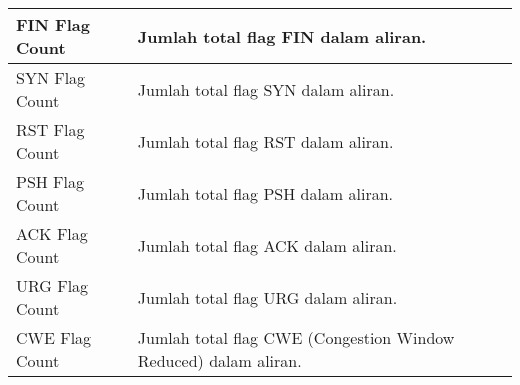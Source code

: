 \documentclass[a4paper,12pt]{report}
\begin{document}
\begin{table}[h!]
\begin{longtable}{|p{3cm} |p{10cm}|}
		\hline
		FIN Flag Count & Jumlah total flag FIN dalam aliran. \\
		\hline
		SYN Flag Count & Jumlah total flag SYN dalam aliran. \\
		\hline
		RST Flag Count & Jumlah total flag RST dalam aliran. \\
		\hline
		PSH Flag Count & Jumlah total flag PSH dalam aliran. \\
		\hline
		ACK Flag Count & Jumlah total flag ACK dalam aliran. \\
		\hline
		URG Flag Count & Jumlah total flag URG dalam aliran. \\
		\hline
		CWE Flag Count & Jumlah total flag CWE (Congestion Window Reduced) dalam aliran. \\
		\hline
	\end{longtable}
\end{table}
\newpage
\end{document}
